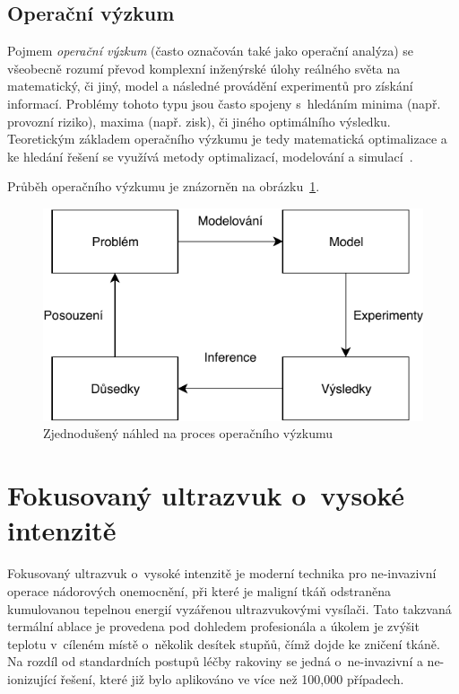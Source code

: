 \subsection{Operační výzkum} \label{subsec:OpRes}
Pojmem \emph{operační výzkum} (často označován také jako operační analýza) se všeobecně rozumí převod komplexní inženýrské úlohy reálného světa na matematický, či jiný, model a následné provádění experimentů pro získání informací. Problémy tohoto typu jsou často spojeny s~hledáním minima (např. provozní riziko), maxima (např. zisk), či jiného optimálního výsledku. Teoretickým základem operačního výzkumu je tedy matematická optimalizace a ke hledání řešení se využívá metody optimalizací, modelování a simulací~\cite{operResearch}.

Průběh operačního výzkumu je znázorněn na obrázku~\ref{fig:Operation_Research}. \\
\begin{figure}[h]
\centering
\includegraphics[width=\linewidth * 3/4]{obrazky-figures/operacniVyzkum.pdf}
\caption{Zjednodušený náhled na proces operačního výzkumu}
\label{fig:Operation_Research}
\end{figure}


\section{Fokusovaný ultrazvuk o~vysoké intenzitě}
\label{about:sec:hifu}
Fokusovaný ultrazvuk o~vysoké intenzitě je moderní technika pro ne-invazivní operace nádorových onemocnění, při které je maligní tkáň odstraněna kumulovanou tepelnou energií vyzářenou ultrazvukovými vysílači. Tato takzvaná termální ablace je provedena pod dohledem profesionála a úkolem je zvýšit teplotu v~cíleném místě o~několik desítek stupňů, čímž dojde ke zničení tkáně. Na rozdíl od standardních postupů léčby rakoviny se jedná o~ne-invazivní a ne-ionizující řešení, které již bylo aplikováno ve více než 100,000 případech.

